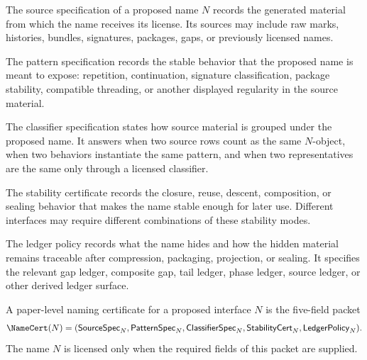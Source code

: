 \begin{definition}
\label{def:philosophy-source-specification}
The source specification of a proposed name \(N\) records the generated
material from which the name receives its license. Its sources may
include raw marks, histories, bundles, signatures, packages, gaps, or
previously licensed names.
\end{definition}

\begin{definition}
\label{def:philosophy-pattern-specification}
The pattern specification records the stable behavior that the proposed
name is meant to expose: repetition, continuation, signature
classification, package stability, compatible threading, or another
displayed regularity in the source material.
\end{definition}

\begin{definition}
\label{def:philosophy-classifier-specification}
The classifier specification states how source material is grouped
under the proposed name. It answers when two source rows count as the
same \(N\)-object, when two behaviors instantiate the same pattern, and
when two representatives are the same only through a licensed
classifier.
\end{definition}

\begin{definition}
\label{def:philosophy-stability-certificate}
The stability certificate records the closure, reuse, descent,
composition, or sealing behavior that makes the name stable enough for
later use. Different interfaces may require different combinations of
these stability modes.
\end{definition}

\begin{definition}
\label{def:philosophy-ledger-policy}
The ledger policy records what the name hides and how the hidden
material remains traceable after compression, packaging, projection, or
sealing. It specifies the relevant gap ledger, composite gap, tail
ledger, phase ledger, source ledger, or other derived ledger surface.
\end{definition}

\begin{definition}
\label{def:philosophy-naming-certificate}
A paper-level naming certificate for a proposed interface \(N\) is the
five-field packet
$$
\begin{gathered}
\NameCert(N)=
(\mathsf{SourceSpec}_{N},
 \mathsf{PatternSpec}_{N},
 \mathsf{ClassifierSpec}_{N},
 \mathsf{StabilityCert}_{N},
 \mathsf{LedgerPolicy}_{N}).
\end{gathered}
$$
The name \(N\) is licensed only when the required fields of this packet
are supplied.
\end{definition}

